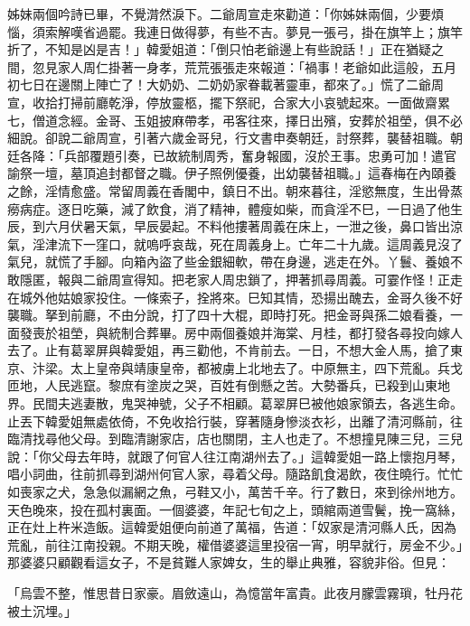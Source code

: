 姊妹兩個吟詩已畢，不覺潸然淚下。二爺周宣走來勸道：「你姊妹兩個，少要煩惱，須索解嘆省過罷。我連日做得夢，有些不吉。夢見一張弓，掛在旗竿上；旗竿折了，不知是凶是吉！」韓愛姐道：「倒只怕老爺邊上有些說話！」正在猶疑之間，忽見家人周仁掛著一身孝，荒荒張張走來報道：「禍事！老爺如此這般，五月初七日在邊關上陣亡了！大奶奶、二奶奶家眷載著靈車，都來了。」慌了二爺周宣，收拾打掃前廳乾淨，停放靈柩，擺下祭祀，合家大小哀號起來。一面做齋累七，僧道念經。金哥、玉姐披麻帶孝，弔客往來，擇日出殯，安葬於祖塋，俱不必細說。卻說二爺周宣，引著六歲金哥兒，行文書申奏朝廷，討祭葬，襲替祖職。朝廷各降：「兵部覆題引奏，已故統制周秀，奮身報國，沒於王事。忠勇可加！遣官諭祭一壇，墓頂追封都督之職。伊子照例優養，出幼襲替祖職。」這春梅在內頤養之餘，淫情愈盛。常留周義在香閣中，鎮日不出。朝來暮往，淫慾無度，生出骨蒸癆病症。逐日吃藥，減了飲食，消了精神，體瘦如柴，而貪淫不巳，一日過了他生辰，到六月伏暑天氣，早辰晏起。不料他摟著周義在床上，一泄之後，鼻口皆出涼氣，淫津流下一窪口，就嗚呼哀哉，死在周義身上。亡年二十九歲。這周義見沒了氣兒，就慌了手腳。向箱內盜了些金銀細軟，帶在身邊，逃走在外。丫鬟、養娘不敢隱匿，報與二爺周宣得知。把老家人周忠鎖了，押著抓尋周義。可霎作怪！正走在城外他姑娘家投住。一條索子，拴將來。巳知其情，恐揚出醜去，金哥久後不好襲職。拏到前廳，不由分說，打了四十大棍，即時打死。把金哥與孫二娘看養，一面發喪於祖塋，與統制合葬畢。房中兩個養娘并海棠、月桂，都打發各尋投向嫁人去了。止有葛翠屏與韓愛姐，再三勸他，不肯前去。一日，不想大金人馬，搶了東京、汴梁。太上皇帝與靖康皇帝，都被虜上北地去了。中原無主，四下荒亂。兵戈匝地，人民逃竄。黎庶有塗炭之哭，百姓有倒懸之苦。大勢番兵，已殺到山東地界。民間夫逃妻散，鬼哭神號，父子不相顧。葛翠屏巳被他娘家領去，各逃生命。止丟下韓愛姐無處依倚，不免收拾行裝，穿著隨身慘淡衣衫，出離了清河縣前，往臨清找尋他父母。到臨清謝家店，店也關閉，主人也走了。不想撞見陳三兒，三兒說：「你父母去年時，就跟了何官人往江南湖州去了。」這韓愛姐一路上懷抱月琴，唱小詞曲，往前抓尋到湖州何官人家，尋着父母。隨路飢食渴飲，夜住曉行。忙忙如喪家之犬，急急似漏網之魚，弓鞋又小，萬苦千辛。行了數日，來到徐州地方。天色晚來，投在孤村裏面。一個婆婆，年記七旬之上，頭綰兩道雪鬢，挽一窩絲，正在灶上杵米造飯。這韓愛姐便向前道了萬福，告道：「奴家是清河縣人氏，因為荒亂，前往江南投親。不期天晚，權借婆婆這里投宿一宵，明早就行，房金不少。」那婆婆只顧觀看這女子，不是貧難人家婢女，生的舉止典雅，容貌非俗。但見：

「烏雲不整，惟思昔日家豪。眉斂遠山，為憶當年富貴。此夜月朦雲霧瑣，牡丹花被土沉埋。」

